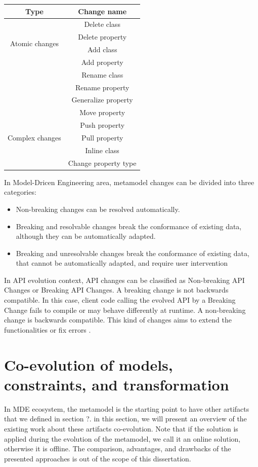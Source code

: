  \vspace{1em}
 	\begin{tabular}{ |c|c| } 
 		\hline
 		Type  & Change name \\
 		\hline
 		\multirow{4}{4em}{ Atomic changes} & Delete class  \\ 
 		& Delete property \\ 
 		& Add class \\ 
 		& Add property \\ 
 		& Rename class \\ 
 		& Rename property \\ 
 		& Generalize property \\ 
 		\hline
 		\hline
 		\multirow{5}{4em}{Complex changes} & Move property \\ 
 		& Push property  \\ 
 		& Pull property\\ 
 		& Inline class\\
 		& Change property type\\
 		\hline
 		
 	\end{tabular}
 	  
 	\vspace{1em}
 	
 In Model-Dricen Engineering area, metamodel changes can be divided into three categories\cite{gruschko2007towards}:
 \begin{itemize}
 	
 \item	Non-breaking changes can be resolved automatically.
  \item Breaking and resolvable changes break the conformance of existing data, although they can be automatically adapted.
 \item Breaking and unresolvable changes break the conformance of existing data, that cannot be automatically adapted, and require user intervention
 \end{itemize}
 	In API evolution context, API changes can be classified as Non-breaking API Changes	or Breaking API Changes. A breaking change is not backwards compatible. In this case, client code calling the evolved API by a Breaking Change fails to compile or may behave differently at runtime. A non-breaking change is backwards compatible. This kind of changes aims to extend the functionalities or fix errors \cite{dig2006apis}.
 \section{Co-evolution of models, constraints, and transformation}
 In MDE ecosystem, the metamodel is the starting point to have other artifacts that we defined in section ?. in this section, we will present an overview of the existing work about these artifacts co-evolution. Note that if the solution is applied during the evolution of the metamodel, we call it an online solution, otherwise it is offline.
 The comparison, advantages, and drawbacks of the presented approaches is out of the scope of this dissertation.
 
